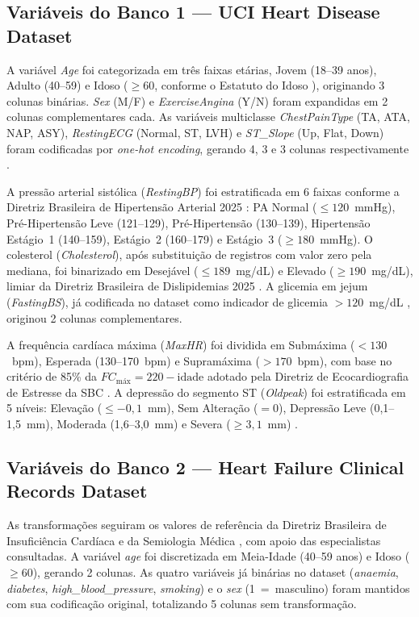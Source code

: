 \subsection{Variáveis do Banco 1 --- UCI Heart Disease Dataset}

A variável \textit{Age} foi categorizada em três faixas etárias, Jovem (18--39 anos), Adulto (40--59) e Idoso ($\geq 60$, conforme o Estatuto do Idoso \cite{brasil2003}), originando 3 colunas binárias. \textit{Sex} (M/F) e \textit{ExerciseAngina} (Y/N) foram expandidas em 2 colunas complementares cada. As variáveis multiclasse \textit{ChestPainType} (TA, ATA, NAP, ASY), \textit{RestingECG} (Normal, ST, LVH) e \textit{ST\_Slope} (Up, Flat, Down) foram codificadas por \textit{one-hot encoding}, gerando 4, 3 e 3 colunas respectivamente \cite{porto2019}.

A pressão arterial sistólica (\textit{RestingBP}) foi estratificada em 6 faixas conforme a Diretriz Brasileira de Hipertensão Arterial 2025 \cite{brandao2025}: PA Normal ($\leq 120$~mmHg), Pré-Hipertensão Leve (121--129), Pré-Hipertensão (130--139), Hipertensão Estágio~1 (140--159), Estágio~2 (160--179) e Estágio~3 ($\geq 180$~mmHg). O colesterol (\textit{Cholesterol}), após substituição de registros com valor zero pela mediana, foi binarizado em Desejável ($\leq 189$~mg/dL) e Elevado ($\geq 190$~mg/dL), limiar da Diretriz Brasileira de Dislipidemias 2025 \cite{rached2025}. A glicemia em jejum (\textit{FastingBS}), já codificada no dataset como indicador de glicemia $> 120$~mg/dL \cite{fedesoriano2021}, originou 2 colunas complementares.

A frequência cardíaca máxima (\textit{MaxHR}) foi dividida em Submáxima ($< 130$~bpm), Esperada (130--170~bpm) e Supramáxima ($> 170$~bpm), com base no critério de 85\% da $FC_{\text{máx}} = 220 - \text{idade}$ adotado pela Diretriz de Ecocardiografia de Estresse da SBC \cite{camarozano2026}. A depressão do segmento ST (\textit{Oldpeak}) foi estratificada em 5 níveis: Elevação ($\leq -0{,}1$~mm), Sem Alteração ($= 0$), Depressão Leve (0,1--1,5~mm), Moderada (1,6--3,0~mm) e Severa ($\geq 3{,}1$~mm) \cite{porto2019}.

\subsection{Variáveis do Banco 2 --- Heart Failure Clinical Records Dataset}

As transformações seguiram os valores de referência da Diretriz Brasileira de Insuficiência Cardíaca \cite{rohde2018} e da Semiologia Médica \cite{porto2019}, com apoio das especialistas consultadas. A variável \textit{age} foi discretizada em Meia-Idade (40--59 anos) e Idoso ($\geq 60$), gerando 2 colunas. As quatro variáveis já binárias no dataset (\textit{anaemia}, \textit{diabetes}, \textit{high\_blood\_pressure}, \textit{smoking}) e o \textit{sex} (1~=~masculino) foram mantidos com sua codificação original, totalizando 5 colunas sem transformação.

